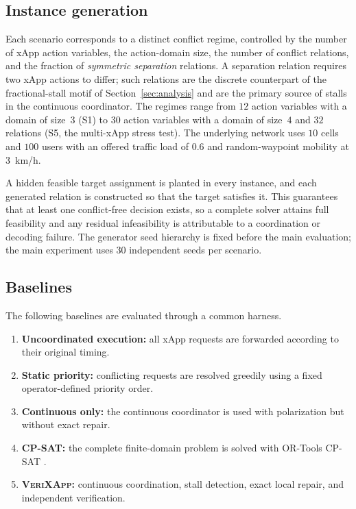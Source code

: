 \documentclass[pdflatex,sn-mathphys-num,iicol,oneside]{sn-jnl}
\newcommand{\method}{\textsc{VeriXApp}}
\begin{document}
\subsection{Instance generation}

Each scenario corresponds to a distinct conflict regime, controlled by the
number of xApp action variables, the action-domain size, the number of
conflict relations, and the fraction of \emph{symmetric separation}
relations. A separation relation requires two xApp actions to differ; such
relations are the discrete counterpart of the fractional-stall motif of
Section~\ref{sec:analysis} and are the primary source of stalls in the
continuous coordinator. The regimes range from $12$ action variables with a
domain of size~$3$ (S1) to $30$ action variables with a domain of size~$4$
and $32$ relations (S5, the multi-xApp stress test). The underlying network
uses $10$ cells and $100$ users with an offered traffic load of $0.6$ and
random-waypoint mobility at $3$~km/h.

A hidden feasible target assignment is planted in every instance, and each
generated relation is constructed so that the target satisfies it. This
guarantees that at least one conflict-free decision exists, so a complete
solver attains full feasibility and any residual infeasibility is
attributable to a coordination or decoding failure. The generator seed
hierarchy is fixed before the main evaluation; the main experiment uses
$30$ independent seeds per scenario.

\subsection{Baselines}

The following baselines are evaluated through a common harness.

\begin{enumerate}
    \item \textbf{Uncoordinated execution:} all xApp requests are
    forwarded according to their original timing.

    \item \textbf{Static priority:} conflicting requests are resolved
    greedily using a fixed operator-defined priority order.

    \item \textbf{Continuous only:} the continuous coordinator is
    used with polarization but without exact repair.

    \item \textbf{CP-SAT:} the complete finite-domain problem is
    solved with OR-Tools CP-SAT \cite{ortools}.

    \item \textbf{\method:} continuous coordination, stall detection,
    exact local repair, and independent verification.
\end{enumerate}
\end{document}
